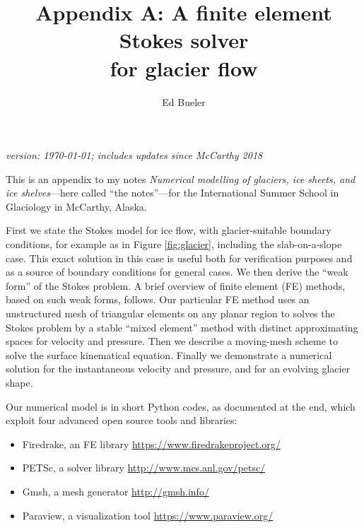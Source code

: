\documentclass[letterpaper,final,12pt,reqno]{amsart}
\begin{document}
\graphicspath{{figures/}}

\title[Appendix A]{Appendix A: A finite element Stokes solver \\ for glacier flow}

\author{Ed Bueler}

\maketitle

\vspace{-8mm}
\begin{center}
\footnotesize
\emph{version: \today; includes updates since McCarthy 2018}
\end{center}

\thispagestyle{empty}
\bigskip

\renewcommand{\thefigure}{A\arabic{figure}}
\renewcommand{\theequation}{A\arabic{equation}}
\renewcommand{\thesection}{A.\arabic{section}}

This is an appendix to my notes \emph{Numerical modelling of glaciers, ice sheets, and ice shelves}---here called ``the notes''---for the International Summer School in Glaciology in McCarthy, Alaska.

First we state the Stokes model for ice flow, with glacier-suitable boundary conditions, for example as in Figure \ref{fig:glacier}, including the slab-on-a-slope case.  This exact solution in this case is useful both for verification purposes and as a source of boundary conditions for general cases.  We then derive the ``weak form'' of the Stokes problem.  A brief overview of finite element (FE) methods, based on such weak forms, follows.  Our particular FE method uses an unstructured mesh of triangular elements on any planar region to solves the Stokes problem by a stable ``mixed element'' method with distinct approximating spaces for velocity and pressure.  Then we describe a moving-mesh scheme to solve the surface kinematical equation.  Finally we demonstrate a numerical solution for the instantaneous velocity and pressure, and for an evolving glacier shape.

Our numerical model is in short Python codes, as documented at the end, which exploit four advanced open source tools and libraries:
\begin{itemize}
\item Firedrake, an FE library \hfill \url{https://www.firedrakeproject.org/}
\item PETSc, a solver library \hfill \url{http://www.mcs.anl.gov/petsc/}
\item Gmsh, a mesh generator \hfill \url{http://gmsh.info/}
\item Paraview, a visualization tool \hfill \url{https://www.paraview.org/}
\end{itemize}
\end{document}

